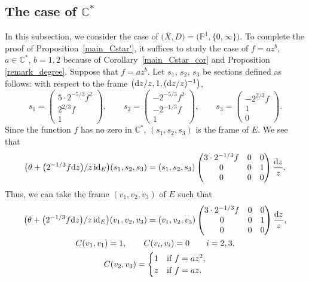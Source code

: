 \documentclass[10pt,a4paper]{amsart}
\numberwithin{equation}{section}
\newcommand{\C}{\mathbb{C}}
\newcommand{\id}{\mathrm{id}}
\begin{document}
\subsection[The case of C*]{The case of $\boldsymbol{\C^*}$}
In this subsection, we consider the case of $\bigl(\overline{X},D\bigr)=\bigl(\mathbb{P}^1,\{0,\infty\}\bigr)$.
To complete the proof of Proposition~\ref{main_Cstar'}, it suffices to study the case of $f=az^b$, $a\in \C^*$, $b=1,2$ because of Corollary~\ref{main_Cstar_cor} and Proposition \ref{remark_degree}. Suppose that $f=az^b$.
Let $s_1$, $s_2$, $s_3$ be sections defined as follows: with respect to the frame $\big({\rm d}z/z,1,({\rm d}z/z)^{-1}\big)$,
\begin{equation*}
 s_1 = \begin{pmatrix}
 5\cdot 2^{-5/3}f^2 \\
 2^{2/3} f \\
 1
 \end{pmatrix}, \qquad
 s_2 = \begin{pmatrix}
 -2^{-5/3}f^2 \\
 -2^{-1/3} f \\
 1
 \end{pmatrix},\qquad
 s_3 = \begin{pmatrix}
 -2^{2/3}f \\
 1 \\
 0
 \end{pmatrix}.
\end{equation*}
Since the function $f$ has no zero in $\C^*$, $(s_1,s_2,s_3)$ is the frame of $E$. We see that
\begin{equation*}
 \big(\theta+\big(2^{-1/3}f {\rm d}z\big)/z\,\id_E\big)(s_1,s_2,s_3) = (s_1,s_2,s_3) \begin{pmatrix}
 3\cdot 2^{-1/3}f & 0 & 0\\
 0 & 0 & 1 \\
 0 & 0 & 0
 \end{pmatrix}\frac{{\rm d}z}{z}.
\end{equation*}
Thus, we can take the frame $(v_1,v_2,v_3)$ of $E$ such that
\begin{gather*}
 \big(\theta+\big(2^{-1/3}f {\rm d}z\big)/z\,\id_E\big)(v_1,v_2,v_3) = (v_1,v_2,v_3) \begin{pmatrix}
 3\cdot 2^{-1/3}f & 0 & 0\\
 0 & 0 & 1 \\
 0 & 0 & 0
 \end{pmatrix}\frac{{\rm d}z}{z},\\
 C(v_1,v_1)=1,\qquad C(v_i,v_i)=0\qquad i=2,3,\\
 C(v_2,v_3)=\begin{cases}
 1 & \text{if $f=az^2$},\\
 z & \text{if $f=az$}.
 \end{cases}
\end{gather*}
\end{document}
